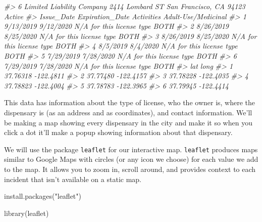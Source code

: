 \documentclass[
]{krantz}
\makeatletter
\newenvironment{Shaded}{\begin{snugshade}}{\end{snugshade}}
\newcommand{\CommentTok}[1]{\textcolor[rgb]{0.37,0.37,0.37}{\textit{#1}}}
\newcommand{\FunctionTok}[1]{\textcolor[rgb]{0,0,0}{#1}}
\newcommand{\NormalTok}[1]{#1}
\newcommand{\StringTok}[1]{\textcolor[rgb]{0.5,0.5,0.5}{#1}}
\newenvironment{kframe}{%
\medskip{}
\setlength{\fboxsep}{.8em}
 \def\at@end@of@kframe{}%
 \ifinner\ifhmode%
  \def\at@end@of@kframe{\end{minipage}}%
  \begin{minipage}{\columnwidth}%
 \fi\fi%
 \def\FrameCommand##1{\hskip\@totalleftmargin \hskip-\fboxsep
 \colorbox{shadecolor}{##1}\hskip-\fboxsep
     \hskip-\linewidth \hskip-\@totalleftmargin \hskip\columnwidth}%
 \MakeFramed {\advance\hsize-\width
   \@totalleftmargin\z@ \linewidth\hsize
   \@setminipage}}%
 {\par\unskip\endMakeFramed%
 \at@end@of@kframe}
\renewenvironment{Shaded}{\begin{kframe}}{\end{kframe}}
\makeatother
\begin{document}
\begin{Shaded}
\begin{Highlighting}[]
\CommentTok{\#\textgreater{} 6 Limited Liability Company 2414 Lombard ST San Francisco, CA 94123 Active}
\CommentTok{\#\textgreater{}   Issue\_Date Expiration\_Date                Activities Adult{-}Use/Medicinal}
\CommentTok{\#\textgreater{} 1  9/13/2019       9/12/2020 N/A for this license type                BOTH}
\CommentTok{\#\textgreater{} 2  8/26/2019       8/25/2020 N/A for this license type                BOTH}
\CommentTok{\#\textgreater{} 3  8/26/2019       8/25/2020 N/A for this license type                BOTH}
\CommentTok{\#\textgreater{} 4   8/5/2019        8/4/2020 N/A for this license type                BOTH}
\CommentTok{\#\textgreater{} 5  7/29/2019       7/28/2020 N/A for this license type                BOTH}
\CommentTok{\#\textgreater{} 6  7/29/2019       7/28/2020 N/A for this license type                BOTH}
\CommentTok{\#\textgreater{}        lat      long}
\CommentTok{\#\textgreater{} 1 37.76318 {-}122.4811}
\CommentTok{\#\textgreater{} 2 37.77480 {-}122.4157}
\CommentTok{\#\textgreater{} 3 37.78228 {-}122.4035}
\CommentTok{\#\textgreater{} 4 37.78823 {-}122.4004}
\CommentTok{\#\textgreater{} 5 37.78783 {-}122.3965}
\CommentTok{\#\textgreater{} 6 37.79945 {-}122.4414}
\end{Highlighting}
\end{Shaded}

This data has information about the type of license, who the owner is, where the dispensary is (as an address and as coordinates), and contact information. We'll be making a map showing every dispensary in the city and make it so when you click a dot it'll make a popup showing information about that dispensary.

We will use the package \texttt{leaflet} for our interactive map. \texttt{leaflet} produces maps similar to Google Maps with circles (or any icon we choose) for each value we add to the map. It allows you to zoom in, scroll around, and provides context to each incident that isn't available on a static map.

\begin{Shaded}
\begin{Highlighting}[]
\FunctionTok{install.packages}\NormalTok{(}\StringTok{"leaflet"}\NormalTok{)}
\end{Highlighting}
\end{Shaded}

\begin{Shaded}
\begin{Highlighting}[]
\FunctionTok{library}\NormalTok{(leaflet)}
\end{Highlighting}
\end{Shaded}
\end{document}
